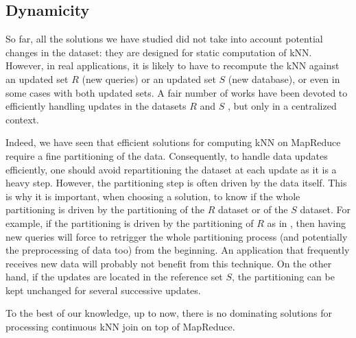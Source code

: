 \subsection{Dynamicity}
So far, all the solutions we have studied did not take into account potential changes in the dataset: they are designed for static computation of kNN. 
However, in real applications, it is likely to have to recompute the kNN against an updated set $R$ (new queries) or an updated set $S$ (new database), 
or even in some cases with both updated sets. A fair number of works have been devoted to efficiently handling updates in the datasets $R$ and $S$ 
\cite{bohm2007efficiently,DBLP:journals/geoinformatica/YuZHX10}, but only in a centralized context.  


Indeed, we have seen that efficient solutions for computing kNN on MapReduce require a fine partitioning of the data. Consequently, to handle data updates 
efficiently, one should avoid repartitioning the dataset at each update as it is a heavy step. However, the partitioning step is often driven by the data 
itself.
This is why it is important, when choosing a solution, to know if the whole partitioning is driven by the partitioning of the $R$ dataset or of the $S$ 
dataset. 
For example, if the partitioning is driven by the partitioning of $R$ as in \cite{Zhang:2012:EPK:2247596.2247602,Lu:2012:EPK:2336664.2336674}, then having 
new queries will force to retrigger the whole partitioning process (and potentially the preprocessing of data too) from the beginning. An application that 
frequently receives new data will probably not benefit from this technique.
On the other hand, if the updates are located in the reference set $S$, the partitioning can be kept unchanged for several successive updates.

To the best of our knowledge, up to now, there is no dominating solutions for processing continuous kNN join on top of MapReduce.


